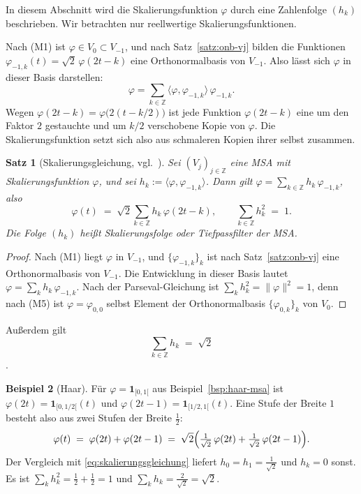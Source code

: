 \documentclass[a4paper,11pt,bibliography=totoc,listof=totoc,headinclude=true,cleardoublepage=empty,oneside]{scrbook}
\theoremstyle{plain}
\newtheorem{Satz}{Satz}[chapter]
\theoremstyle{definition}
\newtheorem{Beispiel}[Satz]{Beispiel}
\newcommand{\Z}{\mathbb{Z}}
\newcommand{\scal}[2]{\langle #1, #2 \rangle}
\newcommand{\norm}[1]{\lVert #1 \rVert}
\begin{document}
In diesem Abschnitt wird die Skalierungsfunktion $\varphi$ durch eine
Zahlenfolge $(h_k)$ beschrieben. Wir betrachten nur reellwertige
Skalierungsfunktionen.

Nach (M1) ist $\varphi \in V_0 \subset V_{-1}$, und nach
Satz~\ref{satz:onb-vj} bilden die Funktionen
$\varphi_{-1,k}(t) = \sqrt2\,\varphi(2t-k)$ eine Orthonormalbasis von $V_{-1}$.
Also lässt sich $\varphi$ in dieser Basis darstellen:
\[
  \varphi = \sum_{k\in\Z} \scal{\varphi}{\varphi_{-1,k}}\,\varphi_{-1,k}.
\]
Wegen $\varphi(2t-k) = \varphi\bigl(2(t-k/2)\bigr)$ ist jede Funktion
$\varphi(2t-k)$ eine um den Faktor $2$ gestauchte und um $k/2$ verschobene
Kopie von $\varphi$. Die Skalierungsfunktion setzt sich also aus schmaleren
Kopien ihrer selbst zusammen.

\begin{Satz}[Skalierungsgleichung, vgl.\ {\cite[Lemma~2.2.3]{lmr}}] %
\label{satz:skalierungsgleichung}
Sei $(V_j)_{j\in\Z}$ eine MSA mit Skalierungsfunktion $\varphi$, und sei
$h_k := \scal{\varphi}{\varphi_{-1,k}}$. Dann gilt
$\varphi = \sum_{k\in\Z} h_k\,\varphi_{-1,k}$, also
\begin{equation}
\label{eq:skalierungsgleichung}
  \varphi(t) \;=\; \sqrt2 \sum_{k\in\Z} h_k\,\varphi(2t-k),
  \qquad
  \sum_{k\in\Z} h_k^2 \;=\; 1 .
\end{equation}
Die Folge $(h_k)$ hei\ss{}t Skalierungsfolge oder Tiefpassfilter der MSA.
\end{Satz}

\begin{proof}
Nach (M1) liegt $\varphi$ in $V_{-1}$, und $\{\varphi_{-1,k}\}_k$ ist nach
Satz~\ref{satz:onb-vj} eine Orthonormalbasis von $V_{-1}$. Die Entwicklung in
dieser Basis \cite[Satz~25.18\,(3)]{serov} %
lautet $\varphi = \sum_k h_k\,\varphi_{-1,k}$. Nach der Parseval-Gleichung
\cite[Satz~25.18\,(5)]{serov} %
ist $\sum_k h_k^2 = \norm{\varphi}^2 = 1$, denn nach (M5) ist
$\varphi = \varphi_{0,0}$ selbst Element der Orthonormalbasis
$\{\varphi_{0,k}\}_k$ von $V_0$.
\end{proof}

Au\ss{}erdem gilt
\begin{equation}
\label{eq:H0}
  \sum_{k\in\Z} h_k \;=\; \sqrt2
\end{equation}
\cite[Satz~2.2.9]{lmr}. %

\begin{Beispiel}[Haar]
\label{bsp:haar-skalierung}
Für $\varphi = \mathbf 1_{[0,1[}$ aus Beispiel~\ref{bsp:haar-msa} ist
$\varphi(2t) = \mathbf 1_{[0,1/2[}(t)$ und
$\varphi(2t-1) = \mathbf 1_{[1/2,1[}(t)$. Eine Stufe der Breite $1$ besteht
also aus zwei Stufen der Breite $\tfrac12$:
\[
  \varphi(t) \;=\; \varphi(2t) + \varphi(2t-1)
  \;=\; \sqrt2\Bigl(\tfrac{1}{\sqrt2}\,\varphi(2t) + \tfrac{1}{\sqrt2}\,\varphi(2t-1)\Bigr).
\]
Der Vergleich mit \eqref{eq:skalierungsgleichung} liefert
$h_0 = h_1 = \tfrac{1}{\sqrt2}$ und $h_k = 0$ sonst. Es ist
$\sum_k h_k^2 = \tfrac12 + \tfrac12 = 1$ und
$\sum_k h_k = \tfrac{2}{\sqrt2} = \sqrt2$.
\end{Beispiel}
\end{document}
